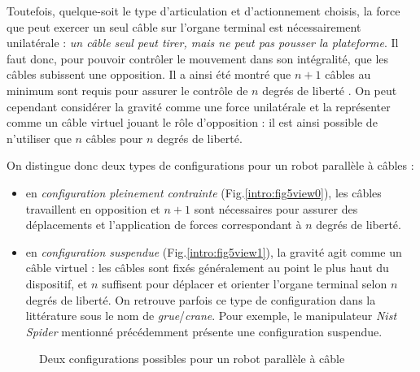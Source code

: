 Toutefois, quelque-soit le type d'articulation et d'actionnement choisis, la force que peut exercer un seul câble sur l'organe terminal est nécessairement unilatérale : {\em un câble seul peut tirer, mais ne peut pas pousser la plateforme}. Il faut donc, pour pouvoir contrôler le mouvement dans son intégralité, que les câbles subissent une opposition. Il a ainsi été montré que $n+1$ câbles au minimum sont requis pour assurer le contrôle de $n$ degrés de liberté \cite{1994:Ming.Higuchi}. On peut cependant considérer la gravité comme une force unilatérale et la représenter comme un câble virtuel jouant le rôle d'opposition : il est ainsi possible de n'utiliser que $n$ câbles pour $n$ degrés de liberté.

On distingue donc deux types de configurations pour un robot parallèle à câbles :
\begin{itemize}
 \item en {\it configuration pleinement contrainte} (Fig.\ref{intro:fig5view0}), les câbles travaillent en opposition et $n+1$ sont nécessaires pour assurer des déplacements et l'application de forces correspondant à $n$ degrés de liberté.
 \item en {\it configuration suspendue} (Fig.\ref{intro:fig5view1}), la gravité agit comme un câble virtuel : les câbles sont fixés généralement au point le plus haut du dispositif, et $n$ suffisent pour déplacer et orienter l'organe terminal selon $n$ degrés de liberté. On retrouve parfois ce type de configuration dans la littérature sous le nom de {\it grue}/{\it crane}. Pour exemple, le manipulateur {\it Nist Spider} \cite{1992:Albus.Bostelman.ea} mentionné précédemment présente une configuration suspendue.
\end{itemize}

\begin{figure}[!ht]
  \centering
      \hfill
    \caption{\footnotesize Deux configurations possibles pour un robot parallèle à câble}
\label{intro:fig5}
\end{figure}

